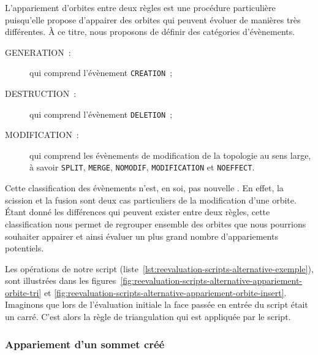 L'appariement d'orbites entre deux règles est une procédure particulière
puisqu'elle propose d'appairer des orbites qui peuvent évoluer de manières très
différentes. %
À ce titre, nous proposons de définir des catégories d'évènements. %
\begin{description}
	\item[{\selectfont{}GENERATION}~:] qui comprend l'évènement \texttt{CREATION}~;
	\item[{\selectfont{}DESTRUCTION}~:] qui comprend l'évènement
	      \texttt{DELETION}~;
	\item[{\selectfont{}MODIFICATION}~:] qui comprend les
	      évènements de modification de la topologie au sens large, à savoir
	      \texttt{SPLIT}, \texttt{MERGE}, \texttt{NOMODIF},
	      \texttt{MO\-DI\-FI\-CA\-T\-I\-ON} et \texttt{NOEFFECT}.
\end{description}
Cette classification des évènements n'est, en soi, pas nouvelle . %
En effet, la scission et la fusion sont deux cas particuliers de la modification
d'une orbite. %
Étant donné les différences qui peuvent exister entre deux règles, cette
classification nous permet de regrouper ensemble des orbites que nous pourrions
souhaiter appairer et ainsi évaluer un plus grand nombre d'appariements
potentiels. %

Les opérations de notre script
(liste~\ref{lst:reevaluation-scripts-alternative-exemple}), sont illustrées dans
les figures~\ref{fig:reevaluation-scripts-alternative-appariement-orbite-tri} et
\ref{fig:reevaluation-scripts-alternative-appariement-orbite-insert}. %
Imaginons que lors de l'évaluation initiale la face passée en entrée du script
était un carré. %
C'est alors la règle de triangulation qui est appliquée par le script. %



\subsubsection{Appariement d'un sommet créé}
\label{sec:reevaluation-scripts-alternative-appariement-creation-sommet}

